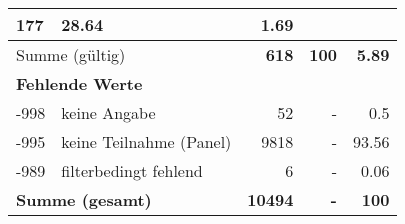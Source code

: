 \begin{longtable}{lXrrr}
       \num{177} &
       \num[round-mode=places,round-precision=2]{28.64} &
         \num[round-mode=places,round-precision=2]{1.69} \\
     \midrule
     \multicolumn{2}{l}{Summe (gültig)} &
       \textbf{\num{618}} &
     \textbf{\num{100}} &
       \textbf{\num[round-mode=places,round-precision=2]{5.89}} \\
     \multicolumn{5}{l}{\textbf{Fehlende Werte}}\\
       -998 &
       keine Angabe &
         \num{52} &
        - &
         \num[round-mode=places,round-precision=2]{0.5} \\
       -995 &
       keine Teilnahme (Panel) &
         \num{9818} &
        - &
         \num[round-mode=places,round-precision=2]{93.56} \\
       -989 &
       filterbedingt fehlend &
         \num{6} &
        - &
         \num[round-mode=places,round-precision=2]{0.06} \\
     \midrule
     \multicolumn{2}{l}{\textbf{Summe (gesamt)}} &
          \textbf{\num{10494}} &
        \textbf{-} &
        \textbf{\num{100}} \\
     \bottomrule
     \end{longtable}
     
